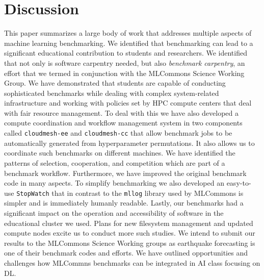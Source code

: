 \section{Discussion}
\label{sec:conclusion}


This paper summarizes a large body of work that addresses multiple aspects of machine learning benchmarking. We identified that benchmarking can lead to a significant educational contribution to students and researchers. We identified that not only is software carpentry needed, but also {\em benchmark carpentry}, an effort that we termed in conjunction with the MLCommons Science Working Group. We have demonstrated that students are capable of conducting sophisticated benchmarks while dealing with complex system-related infrastructure and working with policies set by HPC compute centers that deal with fair resource management. To deal with this we have also developed a compute coordination and workflow management system in two components called \verb|cloudmesh-ee| and \verb|cloudmesh-cc| that allow benchmark jobs to be automatically generated from hyperparameter permutations. It also allows us to coordinate such benchmarks on different machines. We have identified the patterns of selection, cooperation, and competition which are part of a benchmark workflow. Furthermore, we have improved the original benchmark code in many aspects. To simplify benchmarking we also developed an easy-to-use \verb|StopWatch| that in contrast to the \verb|mllog| library used by MLCommons is simpler and is immediately humanly readable. Lastly, our benchmarks had a significant impact on the operation and accessibility of software in the educational cluster we used. Plans for new filesystem management and updated compute nodes excite us to conduct more such studies. We intend to submit our results to the MLCommons Science Working groups as earthquake forecasting is one of their benchmark codes and efforts.
We have outlined opportunities and challenges how MLCommns benchmarks can be integrated in AI class focusing on DL.